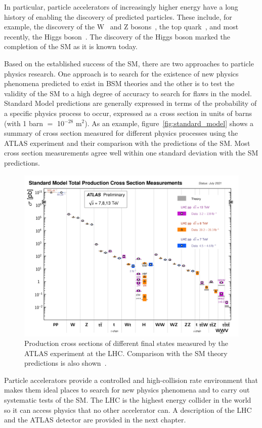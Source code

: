 In particular, particle accelerators of increasingly higher energy have a long history of enabling the discovery of predicted particles. These include, for example, the discovery of the W~\cite{arnison_W_1983, banner_observation_1983} and Z bosons~\cite{arnison_Z_1983, bagnaia_evidence_1983}, the top quark~\cite{cdf_collaboration_observation_1995, d0_collaboration_observation_1995}, and most recently, the Higgs boson~\cite{the_atlas_collaboration_observation_2012, the_cms_collaboration_observation_2012}. The discovery of the Higgs boson marked the completion of the SM as it is known today.

Based on the established success of the SM, there are two approaches to particle physics research. One approach is to search for the existence of new physics phenomena predicted to exist in BSM theories and the other is to test the validity of the SM to a high degree of accuracy to search for flaws in the model. Standard Model predictions are generally expressed in terms of the probability of a specific physics process to occur, expressed as a cross section in units of barns (with 1 barn $=$ 10$^{-28}$ m$^{2}$).  As an example, figure~\ref{fig:standard_model} shows a summary of cross section measured for different physics processes using the ATLAS experiment and their comparison with the predictions of the SM. Most cross section measurements agree well within one standard deviation with the SM predictions. 

\begin{figure}
    \centering
    \includegraphics[width = \textwidth]{figures/atlas_cross_sections.png}
    \caption{Production cross sections of different final states measured by the ATLAS experiment at the LHC. Comparison with the SM theory predictions is also shown~\cite{atlas_public_web_sm}.}
    \label{fig:atlas_cross_sections}
\end{figure}

Particle accelerators provide a controlled and high-collision rate environment that makes them ideal places to search for new physics phenomena and to carry out systematic tests of the SM. The LHC is the highest energy collider in the world so it can access physics that no other accelerator can. A description of the LHC and the ATLAS detector are provided in the next chapter. 